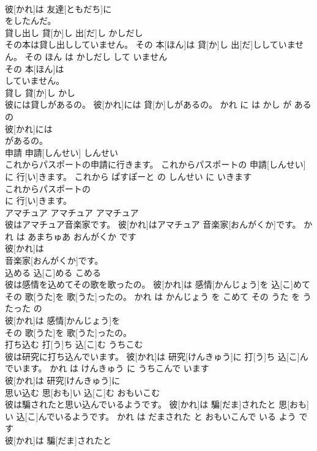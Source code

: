 \documentclass[8pt]{extreport}
\begin{document}
\begin{CJK}{UTF8}{min}
\\	彼[かれ]は 友達[ともだち]に
\\	をしたんだ。			
\\	貸し出し	貸[か]し 出[だ]し	かしだし	
\\	その本は貸し出ししていません。	その 本[ほん]は 貸[か]し 出[だ]ししていません。	その ほん は かしだし して いません	
\\	その 本[ほん]は
\\	していません。			
\\	貸し	貸[か]し	かし	
\\	彼には貸しがあるの。	彼[かれ]には 貸[か]しがあるの。	かれ に は かし が ある の	
\\	彼[かれ]には
\\	があるの。			
\\	申請	申請[しんせい]	しんせい	
\\	これからパスポートの申請に行きます。	これからパスポートの 申請[しんせい]に 行[い]きます。	これから ぱすぽーと の しんせい に いきます	
\\	これからパスポートの
\\	に 行[い]きます。			
\\	アマチュア	アマチュア	アマチュア	
\\	彼はアマチュア音楽家です。	彼[かれ]はアマチュア 音楽家[おんがくか]です。	かれ は あまちゅあ おんがくか です	
\\	彼[かれ]は
\\	音楽家[おんがくか]です。			
\\	込める	込[こ]める	こめる	
\\	彼は感情を込めてその歌を歌ったの。	彼[かれ]は 感情[かんじょう]を 込[こ]めてその 歌[うた]を 歌[うた]ったの。	かれ は かんじょう を こめて その うた を うたった の	
\\	彼[かれ]は 感情[かんじょう]を
\\	その 歌[うた]を 歌[うた]ったの。			
\\	打ち込む	打[う]ち 込[こ]む	うちこむ	
\\	彼は研究に打ち込んでいます。	彼[かれ]は 研究[けんきゅう]に 打[う]ち 込[こ]んでいます。	かれ は けんきゅう に うちこんで います	
\\	彼[かれ]は 研究[けんきゅう]に
\\	思い込む	思[おも]い 込[こ]む	おもいこむ	
\\	彼は騙されたと思い込んでいるようです。	彼[かれ]は 騙[だま]されたと 思[おも]い 込[こ]んでいるようです。	かれ は だまされた と おもいこんで いる よう です	
\\	彼[かれ]は 騙[だま]されたと

\end{CJK}
\end{document}
